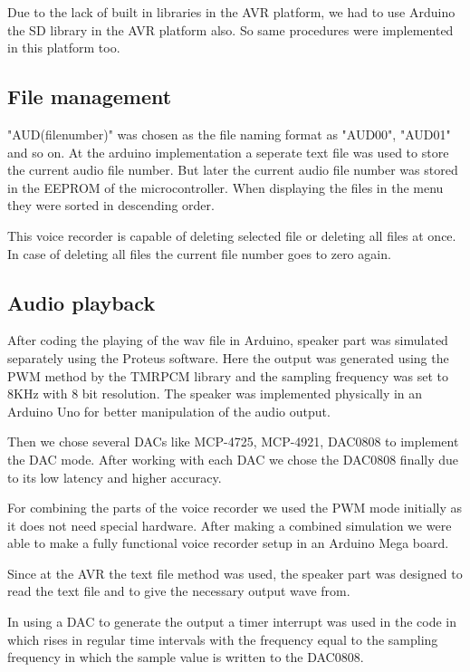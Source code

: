 \documentclass[11pt]{article}
\begin{document}
Due to the lack of built in libraries in the AVR platform, we had to use Arduino the SD library in the AVR platform also. So same procedures were implemented in this platform too. 

\subsection{File management}
"AUD(filenumber)" was chosen as the file naming format as "AUD00", "AUD01" and so on. At the arduino implementation a seperate text file was used to store the current audio file number. But later the current audio file number was stored in the EEPROM of the microcontroller. When displaying the files in the menu they were sorted in descending order. 

This voice recorder is capable of deleting selected file or deleting all files at once. In case of deleting all files the current file number goes to zero again. 

\subsection{Audio playback}
After coding the playing of the wav file in Arduino, speaker part was simulated separately using the Proteus software. Here the output was generated using the PWM method by the TMRPCM library and the sampling frequency was set to 8KHz with 8 bit resolution. The speaker was implemented physically in an Arduino Uno for better manipulation of the audio output.

Then we chose several DACs like MCP-4725, MCP-4921, DAC0808  to implement the  DAC mode. After working with each DAC we chose the DAC0808 finally due to its low latency and higher accuracy.

For combining the parts of the voice recorder we used the PWM mode initially as it does not need special hardware. After making a combined simulation we were able to make a fully functional voice recorder setup in an Arduino Mega board.

Since at the AVR the text file method was used, the speaker part was designed to read the text file and to give the necessary output wave from.

In using a DAC to generate the output a timer interrupt was used in the code in which rises in regular time intervals with the frequency equal to the sampling frequency in which the sample value is written to the DAC0808.
\end{document}
